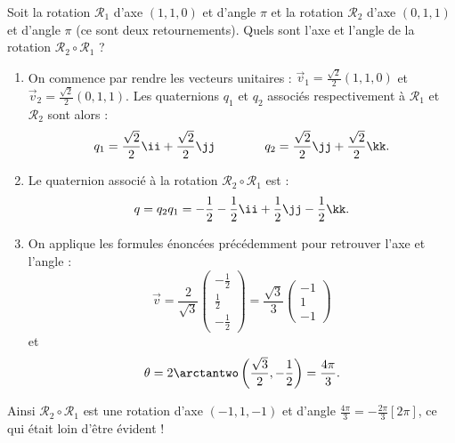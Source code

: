 \documentclass[11pt,class=report,crop=false]{standalone}
\begin{document}
\begin{exemple}
Soit la rotation $\mathcal{R}_1$ d'axe $(1,1,0)$ et d'angle $\pi$ et la rotation $\mathcal{R}_2$ d'axe $(0,1,1)$ et d'angle $\pi$ (ce sont deux retournements). Quels sont l'axe et l'angle de la rotation $\mathcal{R}_2 \circ \mathcal{R}_1$ ?

\begin{enumerate}
  \item On commence par rendre les vecteurs unitaires : $\vec v_1 = \frac{\sqrt2}{2}(1,1,0)$ et $\vec v_2=\frac{\sqrt2}{2}(0,1,1)$. Les quaternions $q_1$ et $q_2$ associés respectivement à $\mathcal{R}_1$ et $\mathcal{R}_2$ sont alors :
$$q_1 
= \frac{\sqrt2}{2}\ii + \frac{\sqrt2}{2}\jj
\qquad \qquad
q_2 = \frac{\sqrt2}{2}\jj + \frac{\sqrt2}{2}\kk.$$  

  \item Le quaternion associé à la rotation $\mathcal{R}_2 \circ \mathcal{R}_1$ est :
$$q = q_2 q_1 = -\frac12 -\frac12 \ii + \frac12\jj -\frac12\kk.$$
  
  \item On applique les formules énoncées précédemment pour retrouver l'axe et l'angle :
  $$\vec v = \frac{2}{\sqrt 3} \begin{pmatrix}-\frac12\\\frac12\\-\frac12\end{pmatrix}
  = \frac{\sqrt 3}{3} \begin{pmatrix}-1\\1\\-1\end{pmatrix}$$
  et 
  $$
\theta = 2\arctantwo\left(\frac{\sqrt3}{2},-\frac12\right) = \frac{4\pi}{3}.$$
\end{enumerate}

Ainsi $\mathcal{R}_2 \circ \mathcal{R}_1$ est une rotation d'axe $(-1,1,-1)$ et d'angle $\frac{4\pi}{3} = -\frac{2\pi}{3} [2\pi]$, ce qui était loin d'être évident !
\end{exemple}
\end{document}
